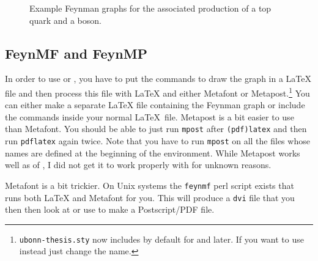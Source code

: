 \begin{figure}[htbp]
  \centering
  \quad
  \caption{Example Feynman graphs for the associated production
    of a top quark and a \PZ boson.}
  \label{fig:tZq-pyfeyn}
\end{figure}


\subsection{FeynMF and FeynMP}
\label{sec:fig:feynman:feynmf}

In order to use  or , you have to put
the commands to draw the graph in a \LaTeX{} file and then process
this file with \LaTeX{} and either Metafont or
Metapost.\footnote{\texttt{ubonn-thesis.sty} now includes 
  by default for  and later. If you want to use
   instead just change the name.} 
You can either make
a separate \LaTeX{} file containing the Feynman graph or include the
commands inside your normal \LaTeX\ file.  Metapost is
a bit easier to use than Metafont.  You should be able to just run
\texttt{mpost} after \texttt{(pdf)latex} and then run
\texttt{pdflatex} again twice. Note that you have to run
\texttt{mpost} on all the files whose names are defined at the
beginning of the  environment. While Metapost works well
as of , I did not get it to work properly with  for unknown reasons.

Metafont is a bit trickier. On Unix systems the
\texttt{feynmf} perl script exists that runs both \LaTeX{} and
Metafont for you. This will produce a \texttt{dvi} file that you then
then look at or use to make a Postscript/PDF file.

